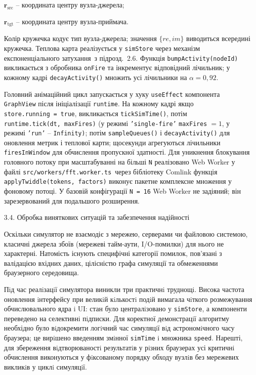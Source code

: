\documentclass[
]{article}
\begin{document}
\(\mathbf{r}_{\text{src}}\) -- координата центру вузла-джерела;

\(\mathbf{r}_{\text{tgt}}\) -- координата центру вузла-приймача.

Колір кружечка кодує тип вузла-джерела; значення \(\{ re,im\}\)
виводиться всередині кружечка. Теплова карта реалізується у
\texttt{simStore} через механізм експоненціального затухання~з
підрозд.~2.6. Функція
\texttt{bumpActivity}\texttt{(}\texttt{nodeId}\texttt{)} викликається з
обробника \texttt{onFire} та інкрементує відповідний лічильник; у
кожному кадрі \texttt{decayActivity}\texttt{()} множить усі лічильники
на \(\alpha = 0,92\).

Головний анімаційний цикл запускається у хуку \texttt{useEffect}
компонента \texttt{GraphView} після ініціалізації \texttt{runtime}. На
кожному кадрі якщо \texttt{store.running}\texttt{\ =\ }\texttt{true},
викликається \texttt{tickSimTime}\texttt{()}, потім
\texttt{runtime.tick}\texttt{(}\texttt{dt}\texttt{,\ }\texttt{maxFires}\texttt{)}
(у режимі \texttt{’}\texttt{single-fire}\texttt{’} \texttt{maxFires}
\(= 1\), у режимі \texttt{’}\texttt{run}\texttt{’} --
\texttt{Infinity}\texttt{)}; потім \texttt{sampleQueues}\texttt{()} і
\texttt{decayActivity}\texttt{()} для оновлення метрик і теплової карти;
щосекунди агрегуються лічильники \texttt{firesInWindow} для обчислення
пропускної здатності. Для уникнення блокування головного потоку при
масштабуванні на більші \texttt{N} реалізовано Web Worker у файлі
\texttt{src}\texttt{/}\texttt{workers}\texttt{/}\texttt{fft.worker.ts}\texttt{\ }через
бібліотеку Comlink функція
\texttt{applyTwiddle}\texttt{(}\texttt{tokens}\texttt{,\ }\texttt{factors}\texttt{)}
виконує пакетне комплексне множення у фоновому потоці. У базовій
конфігурації \texttt{N}\texttt{\ =\ 16} Web Worker не задіяний; він
зарезервований для подальшого розширення.

\protect{}\label{_Toc229681146}{}3.4. Обробка виняткових
ситуацій та забезпечення надійності

Оскільки симулятор не взаємодіє з мережею, серверами чи файловою
системою, класичні джерела збоїв (мережеві тайм-аути, I/O-помилки) для
нього не характерні. Натомість існують специфічні категорії помилок,
пов'язані з валідацією вхідних даних, цілісністю графа симуляції та
обмеженнями браузерного середовища.

Пiд час реалiзацiї симулятора виникли три практичнi труднощi. Висока
частота оновлення iнтерфейсу при великiй кiлькостi подiй вимагала
чiткого розмежування обчислювального ядра i UI: стан було централiзовано
у \texttt{simStore}, а компоненти переведено на селективнi пiдписки.
Для коректної демонстрацiї алгоритму необхідно було вiдокремити логiчний
час симуляцiї вiд астрономiчного часу браузера; це вирiшено введенням
змiнної \texttt{simTime} i множника \texttt{speed}. Нарешті, для
збереження вiдтворюваностi результатiв у рiзних браузерах усі критичнi
обчислення виконуються у фiксованому порядку обходу вузлiв без мережевих
викликiв у циклi симуляцiї.
\end{document}
